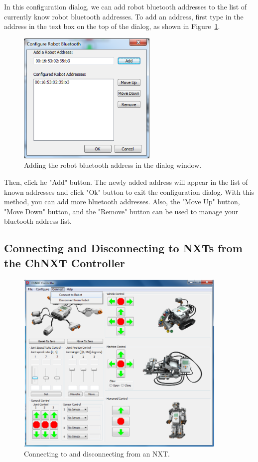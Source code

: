 \documentclass[11pt]{article}
\begin{document}
In this configuration dialog, we can add robot bluetooth addresses to the list of currently know robot bluetooth addresses.
To add an address, first type in the address in the text box on the top of the dialog, as shown in Figure~\ref{fig:add_address}.

\begin{figure}[H]
  \begin{center}
    \includegraphics[height=2.5in]{figure/configuration/addBTaddress.png}
    \caption{Adding the robot bluetooth address in the dialog window.\label{fig:add_address}}
  \end{center}
\end{figure}

Then, click he "Add" button. The newly added address will appear in the list of known addresses and click "Ok" button to exit 
the configuration dialog. With this method, you can add more bluetooth addresses. Also, the "Move Up" button, "Move Down" 
button, and the "Remove" button can be used to manage your bluetooth address list.

\subsection{Connecting and Disconnecting to NXTs from the ChNXT Controller}
\begin{figure}[H]
  \begin{center}
    \includegraphics[height=3.5in]{figure/configuration/menuConnect.png}
    \caption{Connecting to and disconnecting from an NXT.\label{fig:menu_connect}}
  \end{center}
\end{figure}
\end{document}
